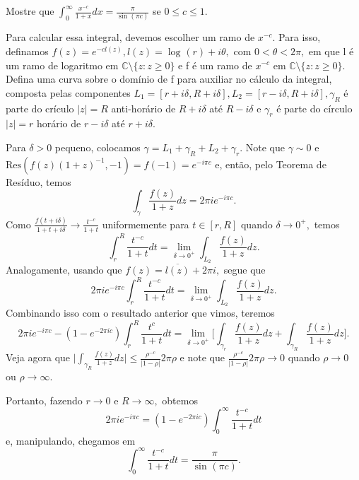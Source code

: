 \documentclass[complex.tex]{subfiles}
\begin{document}
\begin{exer*}
	Mostre que \(\int_{0}^{\infty}\frac{x^{-c}}{1+x}dx = \frac{\pi }{\sin^{}{(\pi c)}}\) se \(0 \leq c\leq 1.\)

	Para calcular essa integral, devemos escolher um ramo de \(x^{-c}.\) Para isso, definamos \(f(z) = e^{-c l(z)}, l(z) = \log^{}{(r)} + i\theta ,\) com
	\(0 < \theta <2\pi ,\) em que l é um ramo de logaritmo em \(\mathbb{C}\setminus{\{z: z\geq 0\}}\) e f é um ramo de \(x^{-c}\) em \(\mathbb{C}\setminus{\{z: z \geq 0\}}.\)
	Defina uma curva sobre o domínio de f para auxiliar no cálculo da integral, composta pelas componentes \(L_{1} = [r+i\delta , R+i\delta ], L_{2} = [r-i\delta , R+i\delta ],\gamma_{R}\)
	é parte do crículo \(|z| = R\) anti-horário de \(R+i\delta \) até \(R-i\delta \) e \(\gamma_{r}\) é parte do círculo \(|z| = r\) horário de \(r-i\delta \) até \(r+i\delta \).

	Para \(\delta > 0\) pequeno, colocamos \(\gamma  = L_{1} + \gamma _{R} + L_{2} + \gamma_{r}\). Note que \(\gamma \sim 0\) e \(\mathrm{Res}(f(z)(1+z)^{-1}, -1) = f(-1) = e^{-i\pi c}\) e, então, pelo Teorema de
	Resíduo, temos
	\[
		\int_{\gamma }^{}\frac{f(z)}{1+z}dz = 2\pi i e^{-i\pi c}.
	\]
	Como \(\frac{f(t+i\delta )}{1+t+i\delta }\to \frac{t^{-c}}{1+t}\) uniformemente para \(t\in[r, R]\) quando \(\delta \to 0^{+},\) temos
	\[
		\int_{r}^{R}\frac{t^{-c}}{1+t}dt = \lim_{\delta \to 0^{+}}\int_{L_{2}}^{}\frac{f(z)}{1+z}dz.
	\]
	Analogamente, usando que \(f(z) = \overline{l(z)}+2\pi i,\) segue que
	\[
		2\pi ie^{-i\pi c}\int_{r}^{R}\frac{t^{-c}}{1+t}dt = \lim_{\delta \to 0^{+}} \int_{L_{2}}^{}\frac{f(z)}{1+z}dz.
	\]
	Combinando isso com o resultado anterior que vimos, teremos
	\[
		2\pi i e^{-i\pi c} - (1 - e^{-2\pi ic})\int_{r}^{R}\frac{t^{c}}{1+t}dt = \lim_{\delta \to 0^{+}}\biggl[\int_{\gamma_{r}}^{}\frac{f(z)}{1+z}dz + \int_{\gamma_R}^{}\frac{f(z)}{1+z}dz\biggr].
	\]
	Veja agora que \(\biggl\vert \int_{\gamma_{R}}^{}\frac{f(z)}{1+z}dz \biggr\vert \leq \frac{\rho ^{-c}}{|1-\rho |}2\pi \rho \) e note que \(\frac{\rho^{-c} }{|1-\rho |}2\pi \rho \to 0\) quando \(\rho \to 0\) ou \(\rho \to \infty.\)

	Portanto, fazendo \(r\to0\) e \(R\to\infty,\) obtemos
	\[
		2\pi i e^{-i\pi c} = (1-e^{-2\pi ic})\int_{0}^{\infty}\frac{t^{-c}}{1+t}dt
	\]
	e, manipulando, chegamos em
	\[
		\int_{0}^{\infty}\frac{t^{-c}}{1+t}dt = \frac{\pi }{\sin^{}{(\pi c)}}.
	\]
\end{exer*}
\end{document}

